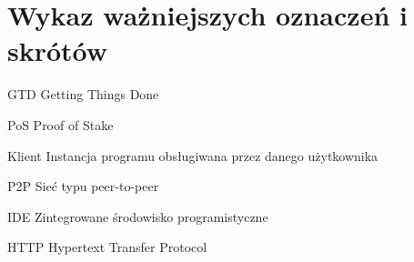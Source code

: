 \chapter*{Wykaz ważniejszych oznaczeń i skrótów}

\begin{abbrev}
\item[GTD] Getting Things Done
\item[PoS] Proof of Stake
\item[Klient] Instancja programu obsługiwana przez danego użytkownika
\item[P2P] Sieć typu peer-to-peer
\item[IDE] Zintegrowane środowisko programistyczne
\item[HTTP] Hypertext Transfer Protocol
\end{abbrev}

